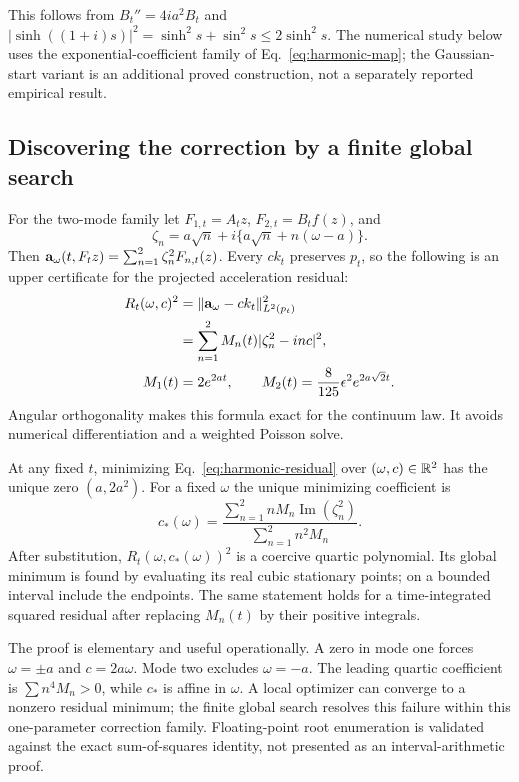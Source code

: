 This follows from $B_t''=4ia^2B_t$ and
$|\sinh((1+i)s)|^2=\sinh^2s+\sin^2s\le2\sinh^2s$.
The numerical study below uses the exponential-coefficient family of
Eq.~\eqref{eq:harmonic-map}; the Gaussian-start variant is an additional
proved construction, not a separately reported empirical result.

\subsection{Discovering the correction by a finite global search}

For the two-mode family let $F_{1,t}=A_tz$, $F_{2,t}=B_tf(z)$, and
\[
 \zeta_n=a\sqrt n+i\{a\sqrt n+n(\omega-a)\}.
\]
Then $\mathbf a_\omega(t,F_tz)=\sum_{n=1}^2\zeta_n^2F_{n,t}(z)$.
Every $c k_t$ preserves $p_t$, so the following is an upper certificate
for the projected acceleration residual:
\begin{align}
 R_t(\omega,c)^2
 &=\|\mathbf a_\omega-c k_t\|_{L^2(p_t)}^2\nonumber\\
 &=\sum_{n=1}^2 M_n(t)|\zeta_n^2-inc|^2,\label{eq:harmonic-residual}\\
 M_1(t)&=2e^{2at},\qquad
 M_2(t)=\frac8{125}\epsilon^2e^{2a\sqrt2t}.\nonumber
\end{align}
Angular orthogonality makes this formula exact for the continuum law.
It avoids numerical differentiation and a weighted Poisson solve.

\begin{proposition}
\label{prop:harmonic-search}
At any fixed $t$, minimizing Eq.~\eqref{eq:harmonic-residual} over
$(\omega,c)\in\mathbb R^2$ has the unique zero $(a,2a^2)$.
For a fixed $\omega$ the unique minimizing coefficient is
\[
 c_*(\omega)=
 \frac{\sum_{n=1}^2nM_n\operatorname{Im}(\zeta_n^2)}
      {\sum_{n=1}^2n^2M_n}.
\]
After substitution, $R_t(\omega,c_*(\omega))^2$ is a coercive quartic
polynomial. Its global minimum is found by evaluating its real cubic
stationary points; on a bounded interval include the endpoints.
The same statement holds for a time-integrated squared residual after
replacing $M_n(t)$ by their positive integrals.
\end{proposition}

The proof is elementary and useful operationally. A zero in mode one
forces $\omega=\pm a$ and $c=2a\omega$. Mode two excludes $\omega=-a$.
The leading quartic coefficient is $\sum n^4M_n>0$, while $c_*$ is
affine in $\omega$. A local optimizer can converge to a nonzero residual
minimum; the finite global search resolves this failure within this
one-parameter correction family. Floating-point root enumeration is
validated against the exact sum-of-squares identity, not presented as
an interval-arithmetic proof.

